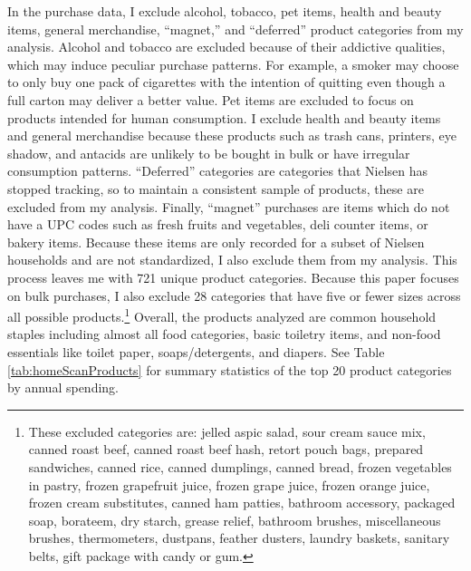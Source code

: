 \documentclass[AER]{AEA_mal}
\begin{document}
In the purchase data, I exclude alcohol, tobacco, pet items, health and beauty items, general merchandise, ``magnet,'' and ``deferred'' product categories from my analysis. Alcohol and tobacco are excluded because of their addictive qualities, which may induce peculiar purchase patterns. For example, a smoker may choose to only buy one pack of cigarettes with the intention of quitting even though a full carton may deliver a better value. Pet items are excluded to focus on products intended for human consumption. I exclude health and beauty items and general merchandise because these products such as trash cans, printers, eye shadow, and antacids are unlikely to be bought in bulk or have irregular consumption patterns. ``Deferred'' categories are categories that Nielsen has stopped tracking, so to maintain a consistent sample of products, these are excluded from my analysis. Finally, ``magnet'' purchases are items which do not have a UPC codes such as fresh fruits and vegetables, deli counter items, or bakery items. Because these items are only recorded for a subset of Nielsen households and are not standardized, I also exclude them from my analysis. This process leaves me with 721 unique product categories. Because this paper focuses on bulk purchases, I also exclude 28 categories that have five or fewer sizes across all possible products.\footnote{These excluded categories are: jelled aspic salad, sour cream sauce mix, canned roast beef, canned roast beef hash, retort pouch bags, prepared sandwiches, canned rice, canned dumplings, canned bread, frozen vegetables in pastry, frozen grapefruit juice, frozen grape juice, frozen orange juice, frozen cream substitutes, canned ham patties, bathroom accessory, packaged soap, borateem, dry starch, grease relief, bathroom brushes, miscellaneous brushes, thermometers, dustpans, feather dusters, laundry baskets, sanitary belts, gift package with candy or gum.} Overall, the products analyzed are common household staples including almost all food categories, basic toiletry items, and non-food essentials like toilet paper, soaps/detergents, and diapers. See Table \ref{tab:homeScanProducts} for summary statistics of the top 20 product categories by annual spending.


\end{document}
